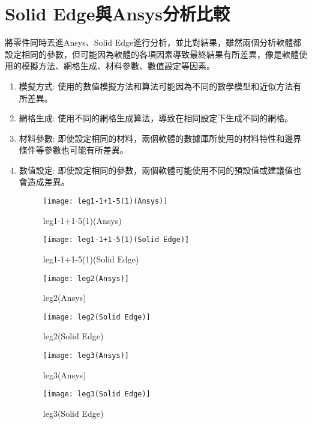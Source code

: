 \section{Solid Edge與Ansys分析比較}
將零件同時丟進Ansys、Solid Edge進行分析，並比對結果，雖然兩個分析軟體都設定相同的參數，但可能因為軟體的各項因素導致最終結果有所差異，像是軟體使用的模擬方法、網格生成、材料參數、數值設定等因素。\
\begin{enumerate}
\item 模擬方式: 使用的數值模擬方法和算法可能因為不同的數學模型和近似方法有所差異。
\item 網格生成: 使用不同的網格生成算法，導致在相同設定下生成不同的網格。
\item 材料參數: 即使設定相同的材料，兩個軟體的數據庫所使用的材料特性和邊界條件等參數也可能有所差異。
\item	數值設定: 即使設定相同的參數，兩個軟體可能使用不同的預設值或建議值也會造成差異。
\newpage
\begin{figure}[htbp]
  \centering
  \begin{minipage}{0.45\textwidth}
    \centering
    \texttt{[image: leg1-1+1-5(1)(Ansys)]}
    \caption{leg1-1+1-5(1)(Ansys)}
    \label{leg1-1+1-5(1)(Ansys)}
  \end{minipage}
  \hfill
  \begin{minipage}{0.45\textwidth}
    \centering
    \texttt{[image: leg1-1+1-5(1)(Solid Edge)]}
    \caption{leg1-1+1-5(1)(Solid Edge)}
    \label{leg1-1+1-5(1)(Solid Edge)}
  \end{minipage}
  
  \vspace{0.75cm} %
  
  \begin{minipage}{0.45\textwidth}
    \centering
    \texttt{[image: leg2(Ansys)]}
    \caption{leg2(Ansys)}
    \label{leg2(Ansys)}
  \end{minipage}
  \hfill
  \begin{minipage}{0.45\textwidth}
    \centering
    \texttt{[image: leg2(Solid Edge)]}
    \caption{leg2(Solid Edge)}
    \label{leg2(Solid Edge)}
  \end{minipage}
\end{figure}
\newpage

\begin{figure}[htbp]
  \centering
  \begin{minipage}{0.45\textwidth}
    \centering
    \texttt{[image: leg3(Ansys)]}
    \caption{leg3(Ansys)}
    \label{leg3(Ansys)}
  \end{minipage}
  \hfill
  \begin{minipage}{0.45\textwidth}
    \centering
    \texttt{[image: leg3(Solid Edge)]}
    \caption{leg3(Solid Edge)}
    \label{leg3(Solid Edge)}
  \end{minipage}
  

\end{figure}
\end{enumerate}
